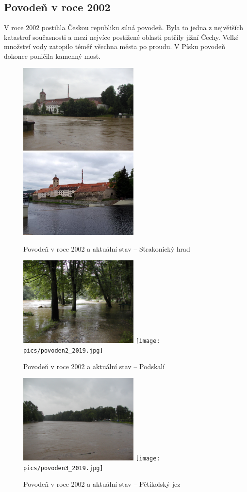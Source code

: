 \documentclass[thesis=M,czech]{FITthesis}[2012/06/26]
\begin{document}
\subsection{Povodeň v roce 2002}
V roce 2002 postihla Českou republiku silná povodeň. Byla to jedna z největších katastrof současnosti a mezi nejvíce postižené oblasti patřily jižní Čechy. Velké množství vody zatopilo téměř všechna města po proudu. V Písku povodeň dokonce poničila kamenný most. 

\begin{figure}[htp]
\centering
\includegraphics[width=6cm]{pics/povoden1.jpg}
\includegraphics[width=6cm]{pics/povoden1_2019.jpg}
\caption{Povodeň v roce 2002 a aktuální stav – Strakonický hrad}
\label{obr:povoden_hrad}
\end{figure}

\begin{figure}[h!]
\centering
\includegraphics[width=6cm]{pics/povoden2.jpg}
\texttt{[image: pics/povoden2\_2019.jpg]}
\caption{Povodeň v roce 2002 a aktuální stav – Podskalí}
\label{obr:povoden_hrad}
\end{figure}

\begin{figure}[h!]
\centering
\includegraphics[width=6cm]{pics/povoden3.jpg}
\texttt{[image: pics/povoden3\_2019.jpg]}
\caption{Povodeň v roce 2002 a aktuální stav – Pětikolský jez}
\label{obr:povoden_hrad}
\end{figure}
\end{document}
